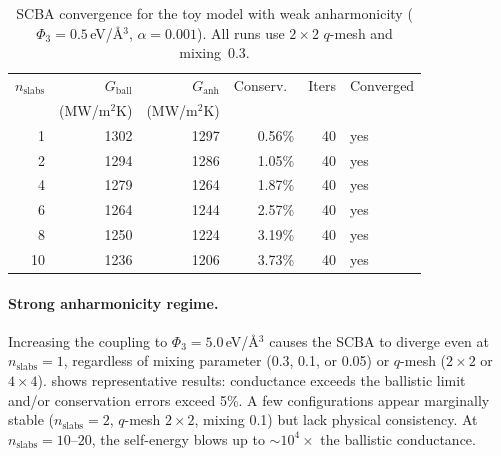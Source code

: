 \begin{table}[h]
  \centering
  \caption{SCBA convergence for the toy model with weak anharmonicity
    ($\Phi_3 = 0.5$\,eV/\AA$^3$, $\alpha = 0.001$).
    All runs use $2\times 2$ $q$-mesh and mixing~0.3.}
  \label{tab:toy_weak}
  \begin{tabular}{rrrrrl}
    \toprule
    $n_\mathrm{slabs}$ & $G_\mathrm{ball}$ & $G_\mathrm{anh}$
      & Conserv.\ & Iters & Converged \\
    & (MW/m$^2$K) & (MW/m$^2$K) & & & \\
    \midrule
    1  & 1302 & 1297 & 0.56\% & 40 & yes \\
    2  & 1294 & 1286 & 1.05\% & 40 & yes \\
    4  & 1279 & 1264 & 1.87\% & 40 & yes \\
    6  & 1264 & 1244 & 2.57\% & 40 & yes \\
    8  & 1250 & 1224 & 3.19\% & 40 & yes \\
    10 & 1236 & 1206 & 3.73\% & 40 & yes \\
    \bottomrule
  \end{tabular}
\end{table}

\paragraph{Strong anharmonicity regime.}
Increasing the coupling to $\Phi_3 = 5.0$\,eV/\AA$^3$ causes the
SCBA to diverge even at $n_\mathrm{slabs} = 1$, regardless of mixing
parameter (0.3, 0.1, or 0.05) or $q$-mesh ($2\times 2$ or
$4\times 4$).   shows representative results:
conductance exceeds the ballistic limit and/or conservation errors
exceed 5\%.  A few configurations appear marginally stable
($n_\mathrm{slabs} = 2$, $q$-mesh $2\times 2$, mixing 0.1) but
lack physical consistency.  At $n_\mathrm{slabs} = 10$--$20$, the
self-energy blows up to $\sim$$10^4\times$ the ballistic conductance.


